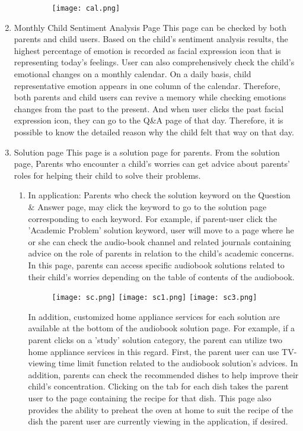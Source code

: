 \documentclass[conference]{IEEEtran}
\begin{document}
\begin{enumerate}
\begin{enumerate}
                \begin{figure}[H]
                 \centering
                 \texttt{[image: cal.png]}
                 \end{figure}
            \end{enumerate}
            \item Monthly Child Sentiment Analysis Page \hfill \break
            This page can be checked by both parents and child users. Based on the child's sentiment analysis results, the highest percentage of emotion is recorded as facial expression icon that is representing today's feelings. User can also comprehensively check the child's emotional changes on a monthly calendar. On a daily basis, child representative emotion appears in one column of the calendar. Therefore, both parents and child users can revive a memory while checking emotions changes from the past to the present. And when user clicks the past facial expression icon, they can go to the Q\&A page of that day. Therefore, it is possible to know the detailed reason why the child felt that way on that day.
            \item Solution page \hfill \break
            This page is a solution page for parents. From the solution page, Parents who encounter a child's worries can get advice about parents' roles for helping their child to solve their problems.
            \begin{enumerate}
                \item In application:
                Parents who check the solution keyword on the Question \& Answer page, may click the keyword to go to the solution page corresponding to each keyword. For example, if parent-user click the 'Academic Problem' solution keyword, user will move to a page where he or she can check the audio-book channel and related journals containing advice on the role of parents in relation to the child's academic concerns. In this page, parents can access specific audiobook solutions related to their child's worries depending on the table of contents of the audiobook.
                 \begin{figure}[H]
                 \centering
                 \texttt{[image: sc.png]}
                 \texttt{[image: sc1.png]}
                 \texttt{[image: sc3.png]}
                 \end{figure}
                 In addition, customized home appliance services for each solution are available at the bottom of the audiobook solution page. For example, if a parent clicks on a 'study' solution category, the parent can utilize two home appliance services in this regard. First, the parent user can use TV-viewing time limit function related to the audiobook solution's advices. In addition, parents can check the recommended dishes to help improve their child's concentration. Clicking on the tab for each dish takes the parent user to the page containing the recipe for that dish. This page also provides the ability to preheat the oven at home to suit the recipe of the dish the parent user are currently viewing in the application, if desired.

\end{enumerate}
\end{enumerate}
\end{document}
